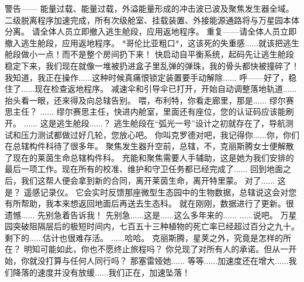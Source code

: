 \documentclass[openany]{book}
\begin{document}
\begin{dialogue}
     警告——
     能量过载、能量过载，外溢能量形成的冲击波已波及聚焦发生器全域。
     二级脱离程序加速完成，所有次级舱室、挂载装置、外接能源通路将与万星园本体分离。
     请全体人员立即撤入逃生舱段，应用返地程序。
     重复——请全体人员立即撤入逃生舱段，应用返地程序。
     *哥伦比亚粗口*，这该死的失重感......就该把逃生舱段做小一点！而不是整个房间扔下来！
     快启动自平衡系统，起码先让逃生舱段稳定下来，我们现在就像一堆被扔进盒子里乱弹的弹珠，我的骨头都快被撞碎了！
     我知道，我正在操作......这种时候真痛恨锁定装置要手动解除......
     呼——好了，稳住了......现在检查返地程序。
     减速伞和引导伞已打开，开始自动调整落地轨道......抬头看一眼，还来得及向总辖告别。
     喂，布利特，你看走廊里，那是......
     缪尔赛思主任？
     ......
     缪尔赛思主任，快进内舱室，里面还有座位，您的认证码应该能刷开。
     ......
     这是逃生舱段......？
     逃生舱段在“弧光一号”设计之初就存在了，导航测试和压力测试都做过好几轮，您放心吧。
     你叫克罗德对吧，我记得你......你，你们在总辖构件科待了很多年。
     聚焦发生器升空前，总辖，不，克丽斯腾女士便解散了现在的莱茵生命总辖构件科。
     充能和聚焦需要人手辅助，这是她为我们安排的最后一项工作。现在所有的校准、维护和守卫任务都已经完成了......
     回到地面之后，我们这帮人便会拿到新的合同，离开莱茵生命，离开特里蒙。
     对了......
     这是？
     遥感记录仪。
     它会实时反馈那座微型生态园中的生物数据，总辖说这会对您有所帮助，我本来想返回地面后再送去生态科。
     就在刚刚，数据进行了更新。很遗憾......
     先别急着告诉我！
     先别急......这是......这么多年来的......
     ......说吧。
     万星园突破阻隔层后的极短时间内，七百五十三种植物的死亡率已经超过百分之九十。剩下的......估计也很难存活。
     ......哈哈。
     克丽斯腾，星荚之外，究竟是怎样的所在？
     明知可能如此，你也不愿终止旅程吗？
     你兑现了对所有人的承诺。但从一开始，你就没打算与任何人同行吗？
     那塞雷娅她......
     等等......加速度还在增大......我们降落的速度并没有放缓......我们正在，加速坠落！

\end{dialogue}
\end{document}
